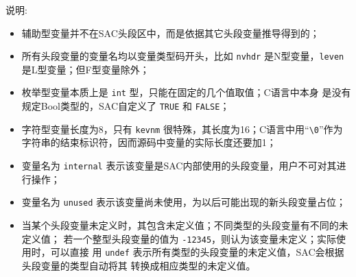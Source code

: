 说明:

\begin{itemize}
\item 辅助型变量并不在SAC头段区中，而是依据其它头段变量推导得到的；
\item 所有头段变量的变量名均以变量类型码开头，比如 \texttt{nvhdr} 是N型变量，\texttt{leven} 是L型变量；但F型变量除外；
\item 枚举型变量本质上是 \texttt{int} 型，只能在固定的几个值取值；C语言中本身
是没有规定Bool类型的，SAC自定义了 \texttt{TRUE} 和 \texttt{FALSE}；
\item 字符型变量长度为8，只有 \texttt{kevnm} 很特殊，其长度为16；C语言中用``\verb|\0|''作为字符串的结束标识符，因而源码中变量的实际长度还要加1；
\item 变量名为 \texttt{internal} 表示该变量是SAC内部使用的头段变量，用户不可对其进行操作；
\item 变量名为 \texttt{unused} 表示该变量尚未使用，为以后可能出现的新头段变量占位；
\item 当某个头段变量未定义时，其包含未定义值；不同类型的头段变量有不同的未定义值；
    若一个整型头段变量的值为 \texttt{-12345}，则认为该变量未定义；实际使用时，可以直接
    用 \texttt{undef} 表示所有类型的头段变量的未定义值，SAC会根据头段变量的类型自动将其
    转换成相应类型的未定义值。
\end{itemize}
